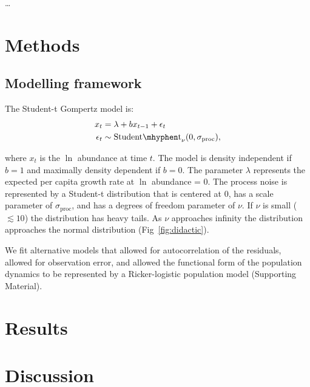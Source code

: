 \documentclass[11pt]{article}
\begin{document}
\citep{doak2008}

\citep{smale2013}

\citep{easterling2000}
\citep{scheffer2003}
\citep{katz2005}

\citep{taleb2007}

\citep{vasseur2014}

\citep{vert-pre2013}
\citep{lindenmayer2010}

\ldots

\section{Methods}

\subsection{Modelling framework}

The Student-t Gompertz model is:
\begin{align*}
x_t &= \lambda + b x_{t-1} + \epsilon_t\\
\epsilon_t &\sim \mathrm{Student\mhyphen t}_\nu(0, \sigma_\mathrm{proc}),
\end{align*}

\noindent where $x_t$ is the $\ln$ abundance at time $t$. The model is density independent if $b = 1$ and maximally density dependent if $b = 0$. The parameter $\lambda$ represents the expected per capita growth rate at $\ln$ abundance = 0. The process noise is represented by a Student-t distribution that is centered at 0, has a scale parameter of $\sigma_\mathrm{proc}$, and has a degrees of freedom parameter of $\nu$. If $\nu$ is small ($\lesssim 10$) the distribution has heavy tails. As $\nu$ approaches infinity the distribution approaches the normal distribution (Fig~\ref{fig:didactic}).

We fit alternative models that allowed for autocorrelation of the residuals, allowed for observation error, and allowed the functional form of the population dynamics to be represented by a Ricker-logistic population model (Supporting Material).

\section{Results}

\section{Discussion}
\end{document}
